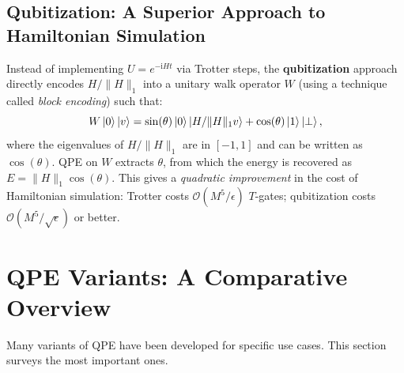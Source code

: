 \documentclass[12pt,a4paper]{article}
\newcommand{\ii}{\mathrm{i}}
\newcommand{\bigO}{\mathcal{O}}
\begin{document}
\subsection{Qubitization: A Superior Approach to Hamiltonian Simulation}

Instead of implementing $U = e^{-\ii Ht}$ via Trotter steps, the
\textbf{qubitization} approach directly encodes $H/\|H\|_1$ into a unitary
walk operator $W$ (using a technique called \emph{block encoding}) such that:
\[
  W\Ket{0}\Ket{v}
  = \sin(\theta)\Ket{0}\Ket{H/\|H\|_1 v} + \cos(\theta)\Ket{1}\Ket{\perp},
\]
where the eigenvalues of $H/\|H\|_1$ are in $[-1,1]$ and can be written as
$\cos(\theta)$.  QPE on $W$ extracts $\theta$, from which the energy is
recovered as $E = \|H\|_1 \cos(\theta)$.  This gives a \emph{quadratic
improvement} in the cost of Hamiltonian simulation:
Trotter costs $\bigO(M^5/\epsilon)$ $T$-gates;
qubitization costs $\bigO(M^5/\sqrt{\epsilon})$ or better.

\newpage

\section{QPE Variants: A Comparative Overview}
\label{app:variants}

Many variants of QPE have been developed for specific use cases.  This
section surveys the most important ones.
\end{document}
